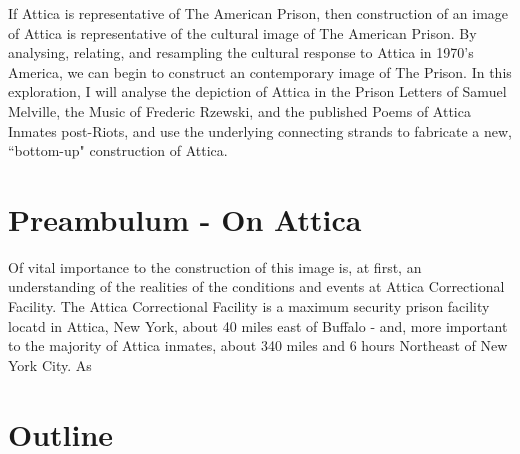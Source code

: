 \documentclass[14pt, letterpaper]{report}
\begin{document}
	If Attica is representative of The American Prison, then construction 
	of an image of Attica is representative of the cultural image of 
	The American Prison. By analysing, relating, and resampling the 
	cultural response to Attica in 1970's America, we can begin to 
	construct an contemporary image of The Prison. In this exploration, 
	I will analyse the depiction of Attica in the Prison Letters of 
	Samuel Melville, the Music of Frederic Rzewski, and the published 
	Poems of Attica Inmates post-Riots, and use the underlying connecting 
	strands to fabricate a new, ``bottom-up" construction of Attica. 
	
	\section*{Preambulum - On Attica}
	
	Of vital importance to the construction of this image is, at first, 
	an understanding of the realities of the conditions and events at 
	Attica Correctional Facility. The Attica Correctional Facility is a 
	maximum security prison facility locatd in Attica, New York, about 
	40 miles east of Buffalo - and, more important to the majority of 
	Attica inmates, about 340 miles and 6 hours Northeast of New York 
	City. As 
	
	\section*{Outline}
	
\end{document}
